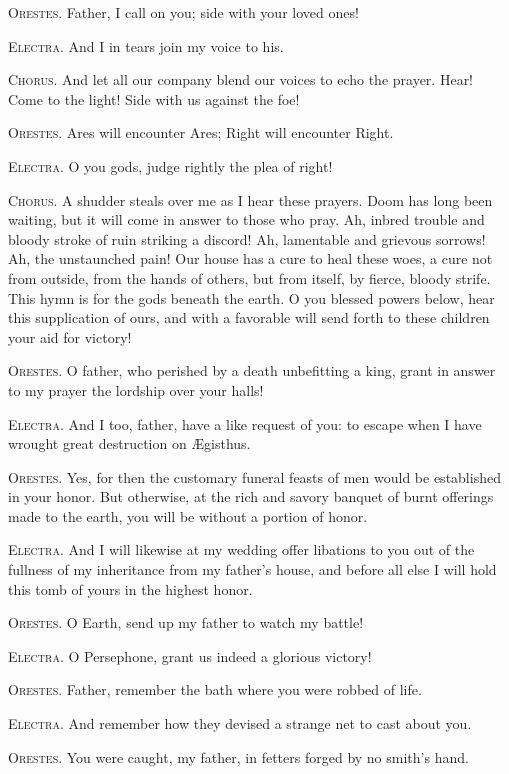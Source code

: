 \documentclass[12pt]{article}
\begin{document}
\textsc{Orestes.} Father, I call on you; side with your loved ones!

\textsc{Electra.} And I in tears join my voice to his.

\textsc{Chorus.} And let all our company blend our voices to echo the prayer. Hear! Come to the light! Side with us against the foe!

\textsc{Orestes.} Ares will encounter Ares; Right will encounter Right.

\textsc{Electra.} O you gods, judge rightly the plea of right!

\textsc{Chorus.} A shudder steals over me as I hear these prayers. Doom has long been waiting, but it will come in answer to those who pray. Ah, inbred trouble and bloody stroke of ruin striking a discord! Ah, lamentable and grievous sorrows! Ah, the unstaunched pain! Our house has a cure to heal these woes, a cure not from outside, from the hands of others, but from itself, by fierce, bloody strife. This hymn is for the gods beneath the earth. O you blessed powers below, hear this supplication of ours, and with a favorable will send forth to these children your aid for victory!

\textsc{Orestes.} O father, who perished by a death unbefitting a king, grant in answer to my prayer the lordship over your halls!

\textsc{Electra.} And I too, father, have a like request of you: to escape when I have wrought great destruction on {\AE}gisthus.

\textsc{Orestes.} Yes, for then the customary funeral feasts of men would be established in your honor. But otherwise, at the rich and savory banquet of burnt offerings made to the earth, you will be without a portion of honor.

\textsc{Electra.} And I will likewise at my wedding offer libations to you out of the fullness of my inheritance from my father's house, and before all else I will hold this tomb of yours in the highest honor.

\textsc{Orestes.} O Earth, send up my father to watch my battle!

\textsc{Electra.} O Persephone, grant us indeed a glorious victory!

\textsc{Orestes.} Father, remember the bath where you were robbed of life.

\textsc{Electra.} And remember how they devised a strange net to cast about you.

\textsc{Orestes.} You were caught, my father, in fetters forged by no smith's hand.
\end{document}
